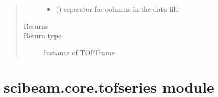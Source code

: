 \documentclass[letterpaper,10pt,english]{sphinxmanual}
\begin{document}
\begin{fulllineitems}
\begin{quote}
\begin{description}
\begin{itemize}
\item {} 
 (\sphinxstyleliteralemphasis{\sphinxupquote{, }}) \textendash{} seperator for columns in the data file

\end{itemize}

\item[{Returns}] \leavevmode


\item[{Return type}] \leavevmode
Instance of TOFFrame

\end{description}\end{quote}

\end{fulllineitems}



\section{scibeam.core.tofseries module}
\label{\detokenize{scibeam.core:module-scibeam.core.tofseries}}\label{\detokenize{scibeam.core:scibeam-core-tofseries-module}}
\end{document}
